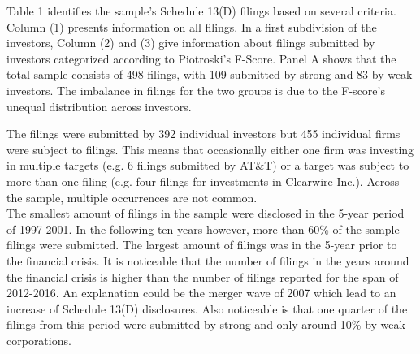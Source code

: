 \documentclass[12pt]{article}
\begin{document}
Table 1 identifies the sample's Schedule 13(D) filings based on several criteria. Column (1) presents information on all filings. In a first subdivision of the investors, Column (2) and (3) give information about filings submitted by investors categorized according to Piotroski's F-Score.
Panel A shows that the total sample consists of 498 filings, with 109 submitted by strong and 83 by weak investors. The imbalance in filings for the two groups is due to the F-score's unequal distribution across investors. 

The filings were submitted by 392 individual investors but 455 individual firms were subject to filings. This means that occasionally either one firm was investing in multiple targets (e.g. 6 filings submitted by AT\&T) or a target was subject to more than one filing (e.g. four filings for investments in Clearwire Inc.). Across the sample, multiple occurrences are not common.\\
The smallest amount of filings in the sample were disclosed in the 5-year period of 1997-2001. In the following ten years however, more than 60\% of the sample filings were submitted. The largest amount of filings was in the 5-year prior to the financial crisis. It is noticeable that the number of filings in the years around the financial crisis is higher than the number of filings reported for the span of 2012-2016. An explanation could be the merger wave of 2007 \citep[p.19]{Huang2017} which lead to an increase of Schedule 13(D) disclosures. Also noticeable is that one quarter of the filings from this period were submitted by strong and only around 10\% by weak corporations.
\end{document}
